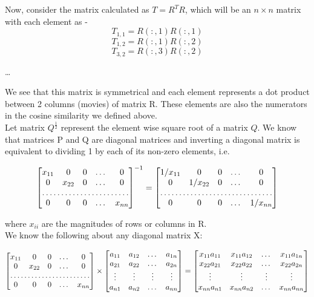 \documentclass[11pt]{article}
\begin{document}
{Now, consider the matrix calculated as $T = R^TR$, which will be an $n \times n$ matrix with each element as -
$$T_{1,1} = R(:, 1) R(:, 1)$$
$$T_{1,2} = R(:, 1) R(:, 2)$$
$$T_{3,2} = R(:, 3) R(:, 2)$$
\begin{center} {\dots} \end{center}

We see that this matrix is symmetrical and each element represents a dot product between 2 columns (movies) of matrix R. These elements are also the numerators in the cosine similarity we defined above. \\

Let matrix $Q^{\frac{1}{2}}$ represent the element wise square root of a matrix $Q$. We know that matrices P and Q are diagonal matrices and inverting a diagonal matrix is equivalent to dividing 1 by each of its non-zero elements, i.e.

\[
\begin{bmatrix}
    x_{11}   & 0 & 0 & \dots &0 \\
    0   & x_{22} & 0 & \dots & 0 \\
    \hdotsfor{5} \\
    0  & 0 & 0 & \dots & x_{nn}
\end{bmatrix}^{-1}
=
\begin{bmatrix}
    1/x_{11}       & 0 & 0 & \dots &0 \\
    0  & 1/x_{22} & 0 & \dots & 0 \\
    \hdotsfor{5} \\
    0   & 0 & 0 & \dots & 1/x_{nn}
\end{bmatrix}
\]

where $x_{ii}$ are the magnitudes of rows or columns in R. \\

We know the following about any diagonal matrix X:

\[
\begin{bmatrix}
    x_{11}   & 0 & 0 & \dots &0 \\
    0   & x_{22} & 0 & \dots & 0 \\
    \hdotsfor{5} \\
    0  & 0 & 0 & \dots & x_{nn}
\end{bmatrix} \times
\begin{bmatrix}
	a_{11} & a_{12} & \dots  & a_{1n} \\
    a_{21} & a_{22} & \dots  & a_{2n} \\
    \vdots & \vdots & \vdots & \vdots \\
    a_{n1} & a_{n2} & \dots  & a_{nn}
\end{bmatrix}
=
\begin{bmatrix}
	x_{11}a_{11} & x_{11}a_{12} &  \dots  & x_{11}a_{1n} \\
    x_{22}a_{21} & x_{22}a_{22} & \dots  & x_{22}a_{2n} \\
    \vdots & \vdots & \vdots & \vdots \\
    x_{nn}a_{n1} & x_{nn}a_{n2} & \dots  & x_{nn}a_{nn}
\end{bmatrix}
\]

}
\end{document}
